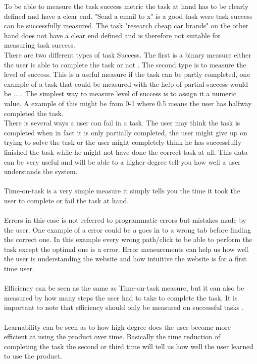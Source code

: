 To be able to measure the task success metric the task at hand has to be clearly defined and have a clear end. "Send a email to x" is a good task were task success can be successfully measured. The task "research cheap car brands" on the other hand does not have a clear end defined and is therefore not suitable for measuring task success. \\ 
There are two different types of task Success. The first is a binary measure either the user is able to complete the task or not \cite{tullis_albert_2011}. The second type is to measure the level of success. This is a useful measure if the task can be partly completed, one example of a task that could be measured with the help of partial success would be ..... The simplest way to measure level of success is to assign it a numeric value. A example of this might be from 0-1 where 0.5 means the user has halfway completed the task.
\\
There is several ways a user can fail in a task. The user may think the task is completed when in fact it is only partially completed, the user might give up on trying to solve the task or the user might completely think he has successfully finished the task while he might not have done the correct task at all. This data can be very useful and will be able to a higher degree tell you how well a user understands the system.
\\\\
Time-on-task is a very simple measure it simply tells you the time it took the user to complete or fail the task at hand.
\\\\
Errors in this case is not referred to programmatic errors but mistakes made by the user. One example of a error could be a goes in to a wrong tab before finding the correct one. In this example every wrong path/click to be able to perform the task except the optimal one is a error. Error measurements can help us how well the user is understanding the website and how intuitive the website is for a first time user. 
\\\\
Efficiency can be seen as the same as Time-on-task measure, but it can also be measured by how many steps the user had to take to complete the task. It is important to note that efficiency should only be measured on successful tasks \cite{tullis_albert_2011}.
\\\\
Learnability can be seen as to how high degree does the user become more efficient at using the product over time. Basically the time reduction of completing the task the second or third time will tell us how well the user learned to use the product.  
